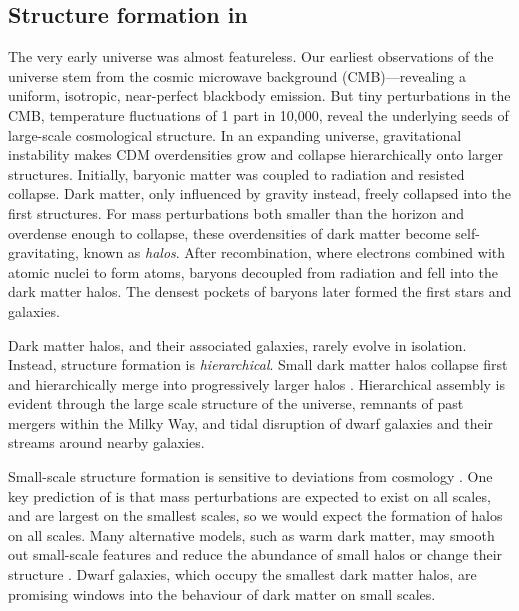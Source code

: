 \subsection{\texorpdfstring{Structure formation in
\LCDM{}}{Structure formation in }}\label{structure-formation-in}

The very early universe was almost featureless. Our earliest
observations of the universe stem from the cosmic microwave background
(CMB)---revealing a uniform, isotropic, near-perfect blackbody emission.
But tiny perturbations in the CMB, temperature fluctuations of 1 part in
10,000, reveal the underlying seeds of large-scale cosmological
structure. In an expanding universe, gravitational instability makes CDM
overdensities grow and collapse hierarchically onto larger structures.
Initially, baryonic matter was coupled to radiation and resisted
collapse. Dark matter, only influenced by gravity instead, freely
collapsed into the first structures. For mass perturbations both smaller
than the horizon and overdense enough to collapse, these overdensities
of dark matter become self-gravitating, known as \emph{halos}. After
recombination, where electrons combined with atomic nuclei to form
atoms, baryons decoupled from radiation and fell into the dark matter
halos. The densest pockets of baryons later formed the first stars and
galaxies.

Dark matter halos, and their associated galaxies, rarely evolve in
isolation. Instead, structure formation is \emph{hierarchical}. Small
dark matter halos collapse first and hierarchically merge into
progressively larger halos
\citep[e.g.,][]{blumenthal+1984, white+rees1978, white+frenk1991}.
Hierarchical assembly is evident through the large scale structure of
the universe, remnants of past mergers within the Milky Way, and tidal
disruption of dwarf galaxies and their streams around nearby galaxies.

Small-scale structure formation is sensitive to deviations from \LCDM{}
cosmology \citep[e.g.,][]{bechtol+2022}. One key prediction of \LCDM{}
is that mass perturbations are expected to exist on all scales, and are
largest on the smallest scales, so we would expect the formation of
halos on all scales. Many alternative models, such as warm dark matter,
may smooth out small-scale features and reduce the abundance of small
halos or change their structure \citep[e.g.,][]{lovell+2014}. Dwarf
galaxies, which occupy the smallest dark matter halos, are promising
windows into the behaviour of dark matter on small scales.


